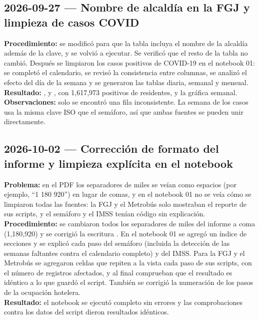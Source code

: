 \subsection{2026-09-27 --- Nombre de alcaldía en la FGJ y limpieza de casos COVID}
\textbf{Procedimiento:} se modificó  para que la tabla
 incluya el nombre de la alcaldía además de la clave, y se volvió a
ejecutar. Se verificó que el resto de la tabla no cambió. Después se limpiaron los casos positivos de
COVID-19 en el notebook 01: se completó el calendario, se revisó la consistencia entre columnas, se
analizó el efecto del día de la semana y se generaron las tablas diaria, semanal y mensual.\\
\textbf{Resultado:} ,  y , con
1,617,973 positivos de residentes, y la gráfica semanal.\\
\textbf{Observaciones:} solo se encontró una fila inconsistente. La semana de los casos usa la misma
clave ISO que el semáforo, así que ambas fuentes se pueden unir directamente.

\subsection{2026-10-02 --- Corrección de formato del informe y limpieza explícita en el notebook}
\textbf{Problema:} en el PDF los separadores de miles se veían como espacios (por ejemplo,
\enquote{1 180 920}) en lugar de comas, y en el notebook 01 no se veía cómo se limpiaron todas las
fuentes: la FGJ y el Metrobús solo mostraban el reporte de sus scripts, y el semáforo y el IMSS tenían
código sin explicación.\\
\textbf{Procedimiento:} se cambiaron todos los separadores de miles del informe a coma (1,180,920) y se
corrigió la escritura . En el notebook 01 se agregó un índice de secciones y se
explicó cada paso del semáforo (incluida la detección de las semanas faltantes contra el calendario
completo) y del IMSS. Para la FGJ y el Metrobús se agregaron celdas que repiten a la vista cada paso de
sus scripts, con el número de registros afectados, y al final comprueban que el resultado es idéntico
a lo que guardó el script. También se corrigió la numeración de los pasos de la ocupación hotelera.\\
\textbf{Resultado:} el notebook se ejecutó completo sin errores y las comprobaciones contra los datos
del script dieron resultados idénticos.

